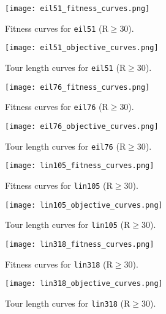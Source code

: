 \documentclass{article}
\begin{document}
\clearpage

\begin{figure}[H]
    \centering
    \texttt{[image: eil51\_fitness\_curves.png]}
    \caption{Fitness curves for \texttt{eil51} (R$\ge$30).}
\end{figure}

\begin{figure}[H]
    \centering
    \texttt{[image: eil51\_objective\_curves.png]}
    \caption{Tour length curves for \texttt{eil51} (R$\ge$30).}
\end{figure}

\clearpage

\begin{figure}[H]
    \centering
    \texttt{[image: eil76\_fitness\_curves.png]}
    \caption{Fitness curves for \texttt{eil76} (R$\ge$30).}
\end{figure}

\begin{figure}[H]
    \centering
    \texttt{[image: eil76\_objective\_curves.png]}
    \caption{Tour length curves for \texttt{eil76} (R$\ge$30).}
\end{figure}

\clearpage

\begin{figure}[H]
    \centering
    \texttt{[image: lin105\_fitness\_curves.png]}
    \caption{Fitness curves for \texttt{lin105} (R$\ge$30).}
\end{figure}

\begin{figure}[H]
    \centering
    \texttt{[image: lin105\_objective\_curves.png]}
    \caption{Tour length curves for \texttt{lin105} (R$\ge$30).}
\end{figure}

\clearpage

\begin{figure}[H]
    \centering
    \texttt{[image: lin318\_fitness\_curves.png]}
    \caption{Fitness curves for \texttt{lin318} (R$\ge$30).}
\end{figure}

\begin{figure}[H]
    \centering
    \texttt{[image: lin318\_objective\_curves.png]}
    \caption{Tour length curves for \texttt{lin318} (R$\ge$30).}
\end{figure}
\end{document}
